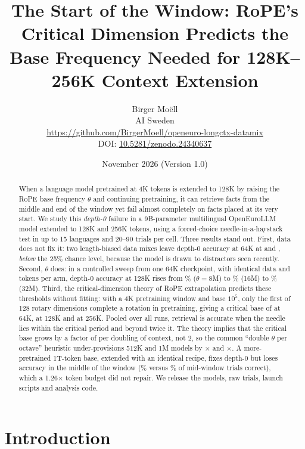 \documentclass[11pt]{article}
\title{\textbf{The Start of the Window: RoPE's Critical Dimension Predicts the Base Frequency Needed for 128K--256K Context Extension}}
\author{Birger Mo\"ell\\[2pt]
\small AI Sweden\\
\small \url{https://github.com/BirgerMoell/openeuro-longctx-datamix}\\
\small DOI: \href{https://doi.org/10.5281/zenodo.24340637}{10.5281/zenodo.24340637}}
\date{November 2026 \quad (Version 1.0)}
\begin{document}
\maketitle

\begin{abstract}
\noindent
When a language model pretrained at 4K tokens is extended to 128K by raising the RoPE base frequency $\theta$ and continuing pretraining, it can retrieve facts from the middle and end of the window yet fail almost completely on facts placed at its very start. We study this \emph{depth-0} failure in a 9B-parameter multilingual OpenEuroLLM model extended to 128K and 256K tokens, using a forced-choice needle-in-a-haystack test in up to 15 languages and 20--90 trials per cell. Three results stand out. First, data does not fix it: two length-biased data mixes leave depth-0 accuracy at 64K at \dataA{} and \dataB{}, \emph{below} the 25\% chance level, because the model is drawn to distractors seen recently. Second, $\theta$ does: in a controlled sweep from one 64K checkpoint, with identical data and \sweepTokens{} tokens per arm, depth-0 accuracy at 128K rises from \swDzThEight\% ($\theta{=}8$M) to \swDzThSixteen\% (16M) to \swDzThThirtyTwo\% (32M). Third, the critical-dimension theory of RoPE extrapolation \citep{liu2024scalinglaws} predicts these thresholds without fitting: with a 4K pretraining window and base $10^5$, only the first \dExtra{} of 128 rotary dimensions complete a rotation in pretraining, giving a critical base of \thetaCritSixtyFour{} at 64K, \thetaCritOneTwentyEight{} at 128K and \thetaCritTwoFiftySix{} at 256K. Pooled over all runs, retrieval is \ratioBelowOne{} accurate when the needle lies within the critical period and \ratioAboveTwo{} beyond twice it. The theory implies that the critical base grows by a factor of \octaveFactor{} per doubling of context, not 2, so the common ``double $\theta$ per octave'' heuristic under-provisions 512K and 1M models by \ratioFiveTwelve$\times$ and \ratioOneM$\times$. A more-pretrained 1T-token base, extended with an identical recipe, fixes depth-0 but loses accuracy in the middle of the window (\midPreludePct\% versus \midVthreePct\% of mid-window trials correct), which a 1.26$\times$ token budget did not repair. We release the models, raw trials, launch scripts and analysis code.
\end{abstract}

\section{Introduction}
\end{document}
